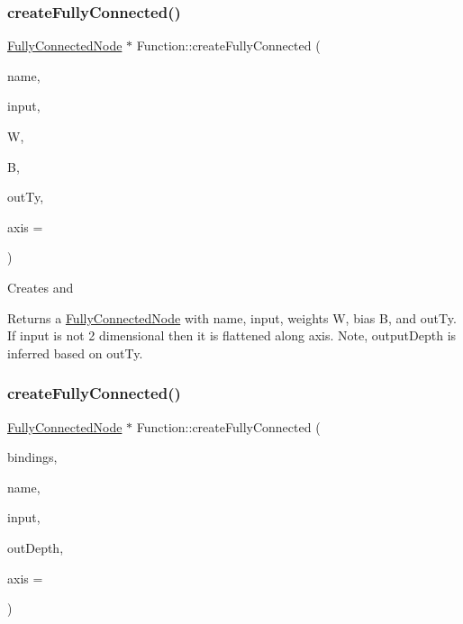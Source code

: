 \subsubsection{\texorpdfstring{create\+Fully\+Connected()}{createFullyConnected()}\hspace{0.1cm}{\footnotesize\ttfamily [2/3]}}
{\footnotesize\ttfamily \hyperlink{classglow_1_1_fully_connected_node}{Fully\+Connected\+Node} $\ast$ Function\+::create\+Fully\+Connected (\begin{DoxyParamCaption}\item[{llvm\+::\+String\+Ref}]{name,  }\item[{\hyperlink{structglow_1_1_node_value}{Node\+Value}}]{input,  }\item[{\hyperlink{structglow_1_1_node_value}{Node\+Value}}]{W,  }\item[{\hyperlink{structglow_1_1_node_value}{Node\+Value}}]{B,  }\item[{\hyperlink{structglow_1_1_type}{Type\+Ref}}]{out\+Ty,  }\item[{\hyperlink{namespaceglow_a0ca574644e1e42ef193a9947fb4d8911}{unsigned\+\_\+t}}]{axis = {} }\end{DoxyParamCaption})}

Creates and \begin{DoxyReturn}{Returns}
a \hyperlink{classglow_1_1_fully_connected_node}{Fully\+Connected\+Node} with {\ttfamily name}, {\ttfamily input}, weights {\ttfamily W}, bias {\ttfamily B}, and {\ttfamily out\+Ty}. If {\ttfamily input} is not 2 dimensional then it is flattened along {\ttfamily axis}. Note, output\+Depth is inferred based on {\ttfamily out\+Ty}. 
\end{DoxyReturn}
\mbox{\label{classglow_1_1_function_ade9306e5e5d5665e16fc64dcf8df3e94}} 
\subsubsection{\texorpdfstring{create\+Fully\+Connected()}{createFullyConnected()}\hspace{0.1cm}{\footnotesize\ttfamily [3/3]}}
{\footnotesize\ttfamily \hyperlink{classglow_1_1_fully_connected_node}{Fully\+Connected\+Node} $\ast$ Function\+::create\+Fully\+Connected (\begin{DoxyParamCaption}\item[{\hyperlink{classglow_1_1_placeholder_bindings}{Placeholder\+Bindings} \&}]{bindings,  }\item[{llvm\+::\+String\+Ref}]{name,  }\item[{\hyperlink{structglow_1_1_node_value}{Node\+Value}}]{input,  }\item[{size\+\_\+t}]{out\+Depth,  }\item[{\hyperlink{namespaceglow_a0ca574644e1e42ef193a9947fb4d8911}{unsigned\+\_\+t}}]{axis = {} }\end{DoxyParamCaption})}

